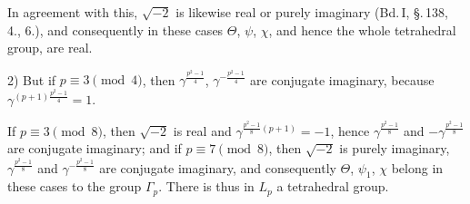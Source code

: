 In agreement with this, $\sqrt{-2}$ is likewise real or purely imaginary
(Bd.\,I, \S.\,138, 4., 6.), and consequently in these cases $\Theta$,
$\psi$, $\chi$, and hence the whole tetrahedral group, are real.

2) But if $p \equiv 3 \pmod 4$, then $\gamma^{\frac{p^2-1}{4}}$,
$\gamma^{-\frac{p^2-1}{4}}$ are conjugate imaginary, because
$\gamma^{(p+1)\frac{p^2-1}{4}} = 1$.

If $p \equiv 3 \pmod 8$, then $\sqrt{-2}$ is real and
$\gamma^{\frac{p^2-1}{8}(p+1)} = -1$, hence $\gamma^{\frac{p^2-1}{8}}$
and $-\gamma^{\frac{p^2-1}{8}}$ are conjugate imaginary; and if $p \equiv 7
\pmod 8$, then $\sqrt{-2}$ is purely imaginary, $\gamma^{\frac{p^2-1}{8}}$
and $\gamma^{-\frac{p^2-1}{8}}$ are conjugate imaginary, and consequently
$\Theta$, $\psi_1$, $\chi$ belong in these cases to the group $\Gamma_p$.
There is thus in  $L_p$ a tetrahedral group.

